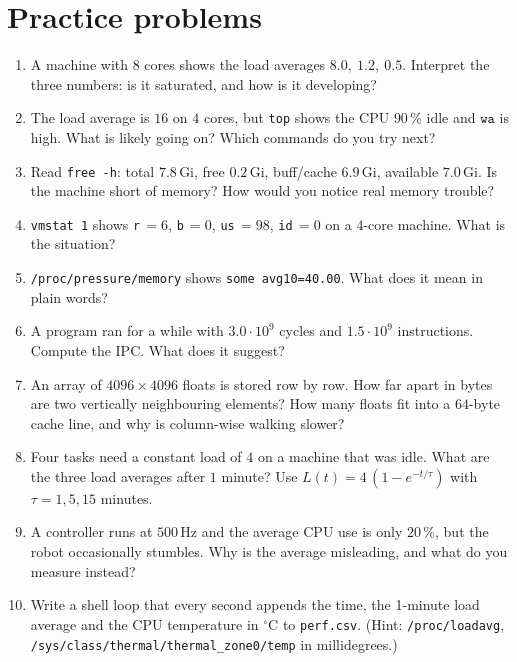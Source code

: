 \section*{Practice problems}
\begin{enumerate}[label=\textbf{\thechapter.\arabic*}]
  \item A machine with $8$ cores shows the load averages $8.0,\ 1.2,\ 0.5$. Interpret the three numbers: is it saturated, and how is it developing?
  \item The load average is $16$ on $4$ cores, but \texttt{top} shows the CPU $90\,\%$ idle and $\texttt{wa}$ is high. What is likely going on? Which commands do you try next?
  \item Read \texttt{free -h}: total $7.8$\,Gi, free $0.2$\,Gi, buff/cache $6.9$\,Gi, available $7.0$\,Gi. Is the machine short of memory? How would you notice real memory trouble?
  \item \texttt{vmstat 1} shows \texttt{r}\,$=6$, \texttt{b}\,$=0$, \texttt{us}\,$=98$, \texttt{id}\,$=0$ on a $4$-core machine. What is the situation?
  \item \texttt{/proc/pressure/memory} shows \texttt{some avg10=40.00}. What does it mean in plain words?
  \item A program ran for a while with $3.0\cdot10^{9}$ cycles and $1.5\cdot10^{9}$ instructions. Compute the IPC. What does it suggest?
  \item An array of $4096\times4096$ floats is stored row by row. How far apart in bytes are two vertically neighbouring elements? How many floats fit into a $64$-byte cache line, and why is column-wise walking slower?
  \item Four tasks need a constant load of $4$ on a machine that was idle. What are the three load averages after $1$ minute? Use $L(t)=4\,(1-e^{-t/\tau})$ with $\tau=1,5,15$ minutes.
  \item A controller runs at $500$\,Hz and the average CPU use is only $20\,\%$, but the robot occasionally stumbles. Why is the average misleading, and what do you measure instead?
  \item[\textbf{\thechapter.10}$\star$] Write a shell loop that every second appends the time, the 1-minute load average and the CPU temperature in $^\circ$C to \texttt{perf.csv}. (Hint: \texttt{/proc/loadavg}, \texttt{/sys/class/thermal/thermal\_zone0/temp} in millidegrees.)
\end{enumerate}

